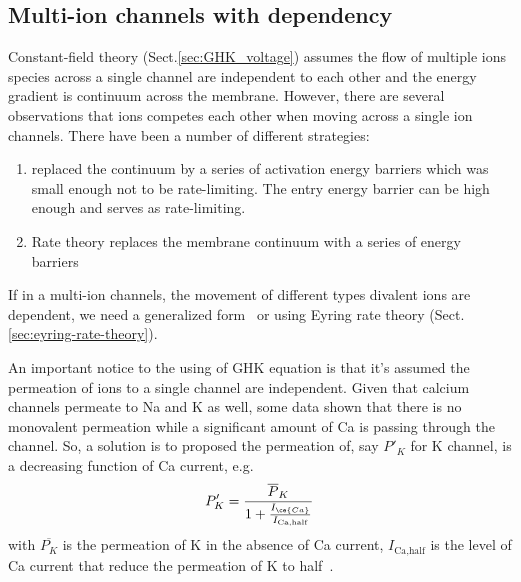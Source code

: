 \subsection{Multi-ion channels with dependency}
\label{sec:multi-ion-channels}


Constant-field theory (Sect.\ref{sec:GHK_voltage}) assumes the flow of
multiple ions species across a single channel are independent to each other and
the energy gradient is continuum across the membrane.
However, there are several observations that ions competes each other when
moving across a single ion channels. There have been a
number of different strategies:
\begin{enumerate}
  \item  \citep{danielli1939} replaced the continuum by a series of activation
  energy barriers which was small enough not to be rate-limiting. The
  entry energy barrier can be high enough and serves as rate-limiting.

  \item Rate theory replaces the membrane continuum with a series of energy
  barriers
\end{enumerate}

If in a multi-ion channels, the movement of different types divalent ions are
dependent, we need a generalized form~\citep{pickard1976gghk} or using Eyring
rate theory (Sect.\ref{sec:eyring-rate-theory}).

\begin{mdframed}
  An important notice to the using of GHK equation is that it's
  assumed the permeation of ions to a single channel are
  independent. Given that calcium channels permeate to Na and K as
  well, some data shown that there is no monovalent permeation while
  a significant amount of Ca is passing through the channel. So, a
  solution is to proposed the permeation of, say $P'_K$ for K channel,
  is a decreasing function of Ca current, e.g.
  \begin{equation}
    \label{eq:949}
    P'_K = \frac{\overline{P}_K}{1+\frac{I_{\ce{Ca}}}{I_\text{Ca,half}}}
  \end{equation}
  with $\overline{P_K}$ is the permeation of K in the absence of Ca current,
  $I_\text{Ca,half}$ is the level of Ca current that reduce the
  permeation of K to half~\citep{jafri1998cad}.
\end{mdframed}

